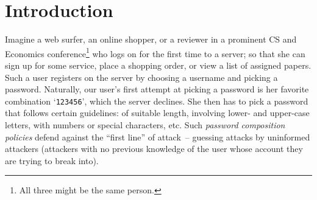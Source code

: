 \documentclass[prodmode,acmec]{ec-acmsmall}
\begin{document}
\maketitle
\section{Introduction} \label{sec:Introduction}
\def \newintro {}
\ifdefined\newintro
{
Imagine a web surfer, an online shopper, or a reviewer in a prominent CS and Economics conference\footnote{All three might be the same person.} who logs on for the first time to a server; so that she can sign up for some service,  place a shopping order, or view a list of assigned papers. Such a user registers on the server by choosing a username and picking a password. Naturally, our user's first attempt at picking a password is her favorite combination `\verb"123456"', which the server declines. She then has to pick a password that follows certain guidelines: of suitable length, involving lower- and upper-case letters, with numbers or special characters, etc. Such \emph{password composition policies} defend against the ``first line'' of attack~-- guessing attacks by uninformed attackers (attackers with no previous knowledge of the user whose account they are trying to break into). 

}
\end{document}

